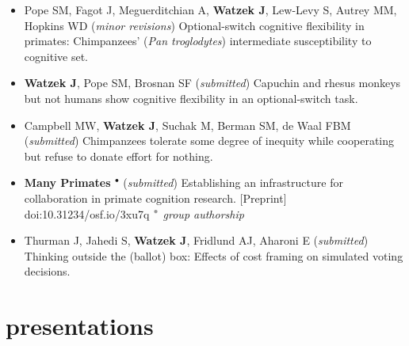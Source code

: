\documentclass[]{friggeri-cv}
\begin{document}
\begin{itemize}[align=center]
  \item Pope SM, Fagot J, Meguerditchian A, \textbf{Watzek J}, Lew-Levy S, Autrey MM, Hopkins WD (\emph{minor revisions}) Optional-switch cognitive flexibility in primates: Chimpanzees' (\emph{Pan troglodytes}) intermediate susceptibility to cognitive set.
  \item \textbf{Watzek J}, Pope SM, Brosnan SF (\emph{submitted}) Capuchin and rhesus monkeys but not humans show cognitive flexibility in an optional-switch task.
  \item Campbell MW, \textbf{Watzek J}, Suchak M, Berman SM, de Waal FBM (\emph{submitted}) Chimpanzees tolerate some degree of inequity while cooperating but refuse to donate effort for nothing.
  \item {\textbf{Many Primates ${}^\bullet$} (\emph{submitted}) Establishing an infrastructure for collaboration in primate cognition research. [Preprint] doi:10.31234/osf.io/3xu7q
        {\quad\small{} $\color{lightgray} {}^\bullet$ \emph{\color{lightgray} group authorship}}}
  \item Thurman J, Jahedi S, \textbf{Watzek J}, Fridlund AJ, Aharoni E (\emph{submitted}) Thinking outside the (ballot) box: Effects of cost framing on simulated voting decisions.
\end{itemize}


\section{presentations}
\end{document}
